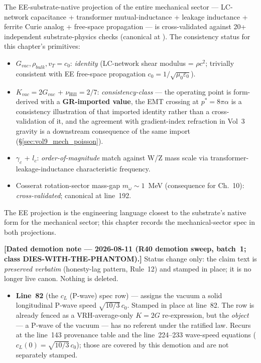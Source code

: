 The EE-substrate-native projection of the entire mechanical sector --- LC-network capacitance + transformer mutual-inductance + leakage inductance + ferrite Curie analog + free-space propagation --- is cross-validated against 20+ independent substrate-physics checks (canonical at ). The consistency status for this chapter's primitives:

\begin{itemize}
    \item $G_{vac}, \rho_{bulk}, v_T = c_0$: \emph{identity} (LC-network shear modulus = $\rho c^2$; trivially consistent with EE free-space propagation $c_0 = 1/\sqrt{\mu_0\varepsilon_0}$).
    \item $K_{vac} = 2 G_{vac}$ + $\nu_{\mathrm{Hill}} = 2/7$: \emph{consistency-class} --- the operating point is form-derived with a \textbf{GR-imported value}, the EMT crossing at $p^* = 8\pi\alpha$ is a consistency illustration of that imported identity rather than a cross-validation of it, and the agreement with gradient-index refraction in Vol~3 gravity is a downstream consequence of the same import (\S\ref{sec:vol9_mech_poisson}).
    \item $\gamma_c$ + $l_c$: \emph{order-of-magnitude} match against W/Z mass scale via transformer-leakage-inductance characteristic frequency.
    \item Cosserat rotation-sector mass-gap $m_\omega \sim 1$~MeV (consequence for Ch.~10): \emph{cross-validated}; canonical at  line~192.
\end{itemize}

The EE projection is the engineering language closest to the substrate's native form for the mechanical sector; this chapter records the mechanical-sector spec in both projections.

\medskip
\noindent\textbf{[Dated demotion note --- 2026-08-11 (R40 demotion sweep, batch~1;
class DIES-WITH-THE-PHANTOM).]} Status change only: the claim text is \emph{preserved
verbatim} (honesty-lag pattern, Rule~12) and stamped in place; it is no longer live canon.
Nothing is deleted.

\begin{itemize}
  \item \textbf{Line~82} (the $c_L$ (P-wave) spec row) --- assigns the vacuum a solid longitudinal P-wave speed $\sqrt{10/3}\,c_0$. Stamped in place at line~82. The row is already fenced as a VRH-average-only $K = 2G$ re-expression, but the \emph{object} --- a P-wave of the vacuum --- has no referent under the ratified law. Recurs at the line~143 provenance table and the line~224--233 wave-speed equations ($c_L(0) = \sqrt{10/3}\,c_0$); those are covered by this demotion and are not separately stamped.
\end{itemize}

